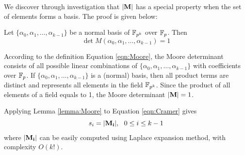 We discover through investigation that ${|\bf M}|$ has a special property when the set of elements forms a basis. The proof is given below:
\begin{Lemma}
\label{lemma:Moore}
Let $\{\alpha_0,\alpha_1,\dots,\alpha_{k-1}\}$ be a normal basis of ${\mathbb{F}}_{p^k}$ over ${\mathbb{F}}_{p}$. Then
\begin{equation}
\det{M(\alpha_0,\alpha_1,\dots,\alpha_{k-1})} = 1
\end{equation}
\end{Lemma}
\begin{Proof}
According to the definition Equation \ref{eqn:Moore}, the Moore determinant consists of all possible linear combinations of 
$\{\alpha_0,\alpha_1,\dots,\alpha_{k-1}\}$ with coefficients over ${\mathbb{F}}_{p}$. If $\{\alpha_0,\alpha_1,\dots,\alpha_{k-1}\}$
is a (normal) basis, then all product terms are distinct and represents all elements in the field ${\mathbb{F}}_{p^k}$. Since the product 
of all elements of a field equals to 1, the Moore determinant ${|\bf M}|=1$.
\end{Proof}

Applying Lemma \ref{lemma:Moore} to Equation \ref{eqn:Cramer} gives
\begin{equation}
s_i = {|\bf M_i|},~~0\leq i\leq k-1
\end{equation}
where ${|\bf M_i|}$ can be easily computed using Laplace expansion method, with complexity $O(k!)$.


